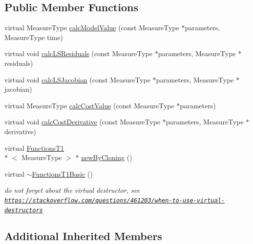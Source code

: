 \subsection*{Public Member Functions}
\begin{DoxyCompactItemize}
\item 
virtual Measure\-Type \hyperlink{class_ox_1_1_functions_t1_basic_a86c92d7a622a925f2c0a8f39c93470d8}{calc\-Model\-Value} (const Measure\-Type $\ast$parameters, Measure\-Type time)
\item 
virtual void \hyperlink{class_ox_1_1_functions_t1_basic_a2e292dec4a234ed53d6cb33c4a590d9f}{calc\-L\-S\-Residuals} (const Measure\-Type $\ast$parameters, Measure\-Type $\ast$residuals)
\item 
virtual void \hyperlink{class_ox_1_1_functions_t1_basic_a8fb79c60d2eaaf8a5d982f4bcddbb21e}{calc\-L\-S\-Jacobian} (const Measure\-Type $\ast$parameters, Measure\-Type $\ast$jacobian)
\item 
virtual Measure\-Type \hyperlink{class_ox_1_1_functions_t1_basic_a60dff997b49111dbeb0f76204cb0dc8f}{calc\-Cost\-Value} (const Measure\-Type $\ast$parameters)
\item 
virtual void \hyperlink{class_ox_1_1_functions_t1_basic_aad13eb43862acead688aeb6781cf8cc7}{calc\-Cost\-Derivative} (const Measure\-Type $\ast$parameters, Measure\-Type $\ast$derivative)
\item 
virtual \hyperlink{class_ox_1_1_functions_t1}{Functions\-T1}\\*
$<$ Measure\-Type $>$ $\ast$ \hyperlink{class_ox_1_1_functions_t1_basic_a0bceaf2c2b424cfa2366d943d92814e3}{new\-By\-Cloning} ()
\item 
\hypertarget{class_ox_1_1_functions_t1_basic_ae3f94c1426a8e6f569b8c70f86122c0b}{virtual \hyperlink{class_ox_1_1_functions_t1_basic_ae3f94c1426a8e6f569b8c70f86122c0b}{$\sim$\-Functions\-T1\-Basic} ()}\label{class_ox_1_1_functions_t1_basic_ae3f94c1426a8e6f569b8c70f86122c0b}

\begin{DoxyCompactList}\small\item\em do not forget about the virtual destructor, see \href{https://stackoverflow.com/questions/461203/when-to-use-virtual-destructors}{\tt https\-://stackoverflow.\-com/questions/461203/when-\/to-\/use-\/virtual-\/destructors} \end{DoxyCompactList}\end{DoxyCompactItemize}
\subsection*{Additional Inherited Members}


